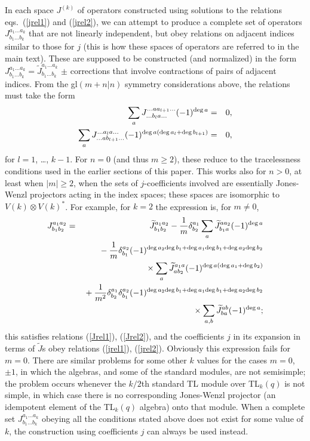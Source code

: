 \documentclass[twocolumn,floats,pra]{revtex4}
\newcommand {\bea}{\begin{eqnarray}}
\newcommand {\eea} {\end{eqnarray}}
\begin{document}
In each space $J^{(k)}$ of operators constructed using solutions
to the relations eqs.\ (\ref{jrel1}) and (\ref{jrel2}), we can
attempt to produce a complete set of operators $J^{a_1\ldots
a_k}_{b_1\ldots b_k}$ that are not linearly independent, but obey
relations on adjacent indices similar to those for $j$ (this is
how these spaces of operators are referred to in the main text).
These are supposed to be constructed (and normalized) in the form
$J^{a_1\ldots a_k}_{b_1\ldots b_k}=\widetilde{J}^{a_1\ldots
a_k}_{b_1\ldots b_k}$ $\pm$ corrections that involve contractions
of pairs of adjacent indices. From the gl$(m+n|n)$ symmetry
considerations above, the relations must take the form%
\bea%
\sum_a J^{\ldots a a_{l+1}\ldots}_{\ldots b_l a\ldots}(-1)^{{\rm
deg}\,a}&=&0, \label{Jrel1}\\
\sum_a J_{\ldots a b_{l+1}\ldots}^{\ldots a_l a\ldots}(-1)^{{\rm
deg}\,a({\rm deg}\,a_l+{\rm deg}\,b_{l+1})}&=&0,\label{Jrel2}
\eea%
for $l=1$, \ldots, $k-1$. For $n=0$ (and thus $m\geq 2$), these
reduce to the tracelessness conditions used in the earlier
sections of this paper. This works also for $n>0$, at least when
$|m|\geq2$, when the sets of $j$-coefficients involved are
essentially Jones-Wenzl projectors acting in the index spaces;
these spaces are isomorphic to $V(k)\otimes V(k)^*$. For
example, for $k=2$ the expression is, for $m\neq0$,%
\bea%
J^{a_1a_2}_{b_1b_2}&=&\widetilde{J}^{a_1a_2}_{b_1b_2}-\frac{1}{m}
\delta^{a_1}_{b_2}\sum_a\widetilde{J}^{aa_2}_{b_1a}(-1)^{{\rm
deg}\,a}\nonumber\\
&&\mbox{}-\frac{1}{m}\delta^{a_2}_{b_1}(-1)^{{\rm deg}\,a_2{\rm
deg}\,b_1+{\rm deg}\,a_1{\rm deg}\,b_1+{\rm deg}\,a_2{\rm
deg}\,b_2}\nonumber\\
&&\mbox{}\quad\times\sum_a\widetilde{J}^{a_1a}_{ab_2}(-1)^{{\rm
deg}\,a({\rm deg}\,a_1+{\rm deg}\,b_2)}\nonumber\\
&&\mbox{}+\frac{1}{m^2}\delta^{a_1}_{b_2}\delta^{a_2}_{b_1}(-1)^{{\rm
deg}\,a_2{\rm deg}\,b_1+{\rm deg}\,a_1{\rm deg}\,b_1+{\rm
deg}\,a_2{\rm deg}\,b_2}\nonumber\\
&&\mbox{}\quad\times\sum_{a,b}\widetilde{J}^{ab}_{ba}(-1)^{{\rm
deg}\,a};
\eea%
this satisfies relations (\ref{Jrel1}), (\ref{Jrel2}), and the
coefficients $j$ in its expansion in terms of $\widetilde{J}$s
obey relations (\ref{jrel1}), (\ref{jrel2}). Obviously this
expression fails for $m=0$. There are similar problems for some
other $k$ values for the cases $m=0$, $\pm1$, in which the
algebras, and some of the standard modules, are not semisimple;
the problem occurs whenever the $k/2$th standard TL module over
TL$_{k}(q)$ is not simple, in which case there is no corresponding
Jones-Wenzl projector (an idempotent element of the TL$_{k}(q)$
algebra) onto that module. When a complete set $J^{a_1\ldots
a_k}_{b_1\ldots b_k}$ obeying all the conditions stated above does
not exist for some value of $k$, the construction using
coefficients $j$ can always be used instead.
\end{document}
